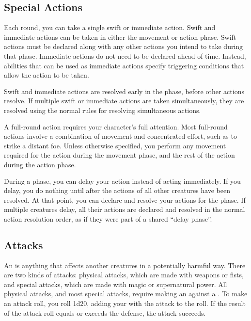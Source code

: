     \subsection{Special Actions}

        \label{Swift and Immediate Actions} Each round, you can take a single swift or immediate action.
        Swift and immediate actions can be taken in either the movement or action phase.
        Swift actions must be declared along with any other actions you intend to take during that phase.
        Immediate actions do not need to be declared ahead of time.
        Instead, abilities that can be used as immediate actions specify triggering conditions that allow the action to be taken.

        Swift and immediate actions are resolved early in the phase, before other actions resolve.
        If multiple swift or immediate actions are taken simultaneously, they are resolved using the normal rules for resolving simultaneous actions.

         A full-round action requires your character's full attention.
        Most full-round actions involve a combination of movement and concentrated effort, such as  to strike a distant foe.
        Unless otherwise specified, you perform any movement required for the action during the movement phase, and the rest of the action during the action phase.

        \label{Delaying}
        During a phase, you can delay your action instead of acting immediately.
        If you delay, you do nothing until after the actions of all other creatures have been resolved.
        At that point, you can declare and resolve your actions for the phase.
        If multiple creatures delay, all their actions are declared and resolved in the normal action resolution order, as if they were part of a shared ``delay phase''.

    \subsection{Attacks}\label{Attacks}
        An  is anything that affects another creatures in a potentially harmful way.
        There are two kinds of attacks: physical attacks, which are made with weapons or fists, and special attacks, which are made with magic or supernatural power.
        All physical attacks, and most special attacks, require making an  against a .
        To make an attack roll, you roll 1d20, adding your  with the attack to the roll.
        If the result of the attack roll equals or exceeds the defense, the attack succeeds.

